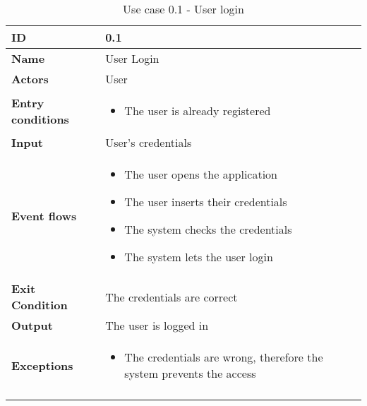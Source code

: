 \begin{longtable}[H]{ | l | p{10cm} | }
\hline
{\cellcolor[rgb]{0.753,0.753,0.753}}\textbf{ID}  & 0.1 \\ \hline
{\cellcolor[rgb]{0.753,0.753,0.753}}\textbf{Name} & User Login \\ \hline
{\cellcolor[rgb]{0.753,0.753,0.753}}\textbf{Actors} & User \\ \hline
{\cellcolor[rgb]{0.753,0.753,0.753}}\textbf{Entry conditions} &
\begin{itemize}
    \item The user is already registered
\end{itemize}
\\ \hline
{\cellcolor[rgb]{0.753,0.753,0.753}}\textbf{Input} & User's credentials \\ \hline
{\cellcolor[rgb]{0.753,0.753,0.753}}\textbf{Event flows} &
\begin{itemize}
    \item The user opens the application
    \item The user inserts their credentials
    \item The system checks the credentials
    \item The system lets the user login
\end{itemize}
\\ \hline
{\cellcolor[rgb]{0.753,0.753,0.753}}\textbf{Exit Condition} & The credentials are correct\\ \hline
{\cellcolor[rgb]{0.753,0.753,0.753}}\textbf{Output} & The user is logged in\\ \hline
{\cellcolor[rgb]{0.753,0.753,0.753}}\textbf{Exceptions} &
\begin{itemize}
    \item The credentials are wrong, therefore the system prevents the access
\end{itemize}
\\ \hline
\caption{Use case 0.1 - User login}
\\
\end{longtable}